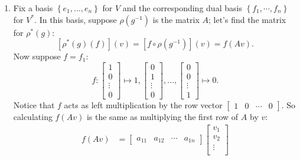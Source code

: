 \documentclass[12pt]{article}
\newcommand\inv[1]{#1^{-1}}
\newcommand\setb[1]{\left \{ #1 \right \}}
\theoremstyle{definition}
\begin{document}
\begin{enumerate}[resume]
    \item Fix a basis $\setb{e_1 , \dotsc, e_n}$ for $V$ and the corresponding dual basis $\setb{f_1 , \dotsb, f_n}$ for $V^*$. In this basis, suppose $\rho \left( \inv{g} \right)$ is the matrix $A$; let's find the matrix for $\rho^*(g)$:
    \begin{equation}
        \left[ \rho^*(g) (f) \right](v) = \left[ f \circ \rho \left( \inv{g} \right) \right] (v) = f(Av).
    \end{equation}
    Now suppose $f = f_1$:
    \begin{equation}
        f : 
        \begin{bmatrix}
            1 \\
            0 \\
            \vdots \\
            0
        \end{bmatrix} 
        \mapsto 1,
        \begin{bmatrix}
            0 \\
            1 \\
            \vdots \\
            0
        \end{bmatrix}, \dotsc ,
        \begin{bmatrix}
            0 \\
            0 \\
            \vdots \\
            1
        \end{bmatrix} 
        \mapsto 0.
    \end{equation}
    Notice that $f$ acts as left multiplication by the row vector 
    $\begin{bmatrix}
        1 & 0 & \cdots & 0
    \end{bmatrix}$. 
    So calculating $f(Av)$ is the same as multiplying the first row of $A$ by $v$:
    \begin{equation}
        \begin{split}
            f(Av) & = 
            \begin{bmatrix}
                a_{11} & a_{12} & \cdots & a_{1n}
            \end{bmatrix} 
            \begin{bmatrix}
                v_1 \\
                v_2 \\
                \vdots \\

\end{bmatrix}
\end{split}
\end{equation}
\end{enumerate}
\end{document}
